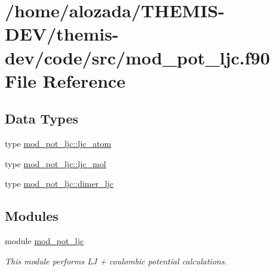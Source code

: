 \hypertarget{mod__pot__ljc_8f90}{}\section{/home/alozada/\+T\+H\+E\+M\+I\+S-\/\+D\+E\+V/themis-\/dev/code/src/mod\+\_\+pot\+\_\+ljc.f90 File Reference}
\label{mod__pot__ljc_8f90}
\subsection*{Data Types}
\begin{DoxyCompactItemize}
\item 
type \hyperlink{structmod__pot__ljc_1_1ljc__atom}{mod\+\_\+pot\+\_\+ljc\+::ljc\+\_\+atom}
\item 
type \hyperlink{structmod__pot__ljc_1_1ljc__mol}{mod\+\_\+pot\+\_\+ljc\+::ljc\+\_\+mol}
\item 
type \hyperlink{structmod__pot__ljc_1_1dimer__ljc}{mod\+\_\+pot\+\_\+ljc\+::dimer\+\_\+ljc}
\end{DoxyCompactItemize}
\subsection*{Modules}
\begin{DoxyCompactItemize}
\item 
module \hyperlink{namespacemod__pot__ljc}{mod\+\_\+pot\+\_\+ljc}
\begin{DoxyCompactList}\small\item\em This module performs LJ + coulombic potential calculations. \end{DoxyCompactList}\end{DoxyCompactItemize}

